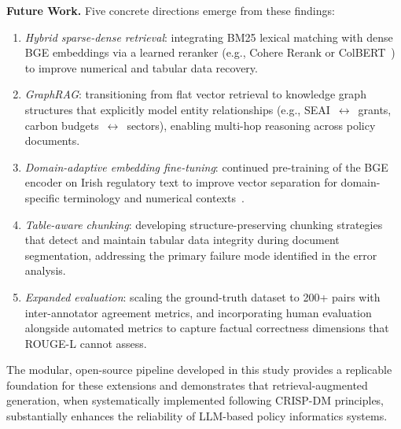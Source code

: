 \documentclass[conference]{IEEEtran}
\begin{document}
\textbf{Future Work.} Five concrete directions emerge from these findings:
\begin{enumerate}[noitemsep]
    \item \textit{Hybrid sparse-dense retrieval}: integrating BM25 lexical matching with dense BGE embeddings via a learned reranker (e.g., Cohere Rerank or ColBERT~\cite{khattab2020colbert}) to improve numerical and tabular data recovery.
    \item \textit{GraphRAG}: transitioning from flat vector retrieval to knowledge graph structures that explicitly model entity relationships (e.g., SEAI~$\leftrightarrow$~grants, carbon budgets~$\leftrightarrow$~sectors), enabling multi-hop reasoning across policy documents.
    \item \textit{Domain-adaptive embedding fine-tuning}: continued pre-training of the BGE encoder on Irish regulatory text to improve vector separation for domain-specific terminology and numerical contexts~\cite{siriwardhana2023improving}.
    \item \textit{Table-aware chunking}: developing structure-preserving chunking strategies that detect and maintain tabular data integrity during document segmentation, addressing the primary failure mode identified in the error analysis.
    \item \textit{Expanded evaluation}: scaling the ground-truth dataset to 200+ pairs with inter-annotator agreement metrics, and incorporating human evaluation alongside automated metrics to capture factual correctness dimensions that ROUGE-L cannot assess.
\end{enumerate}

The modular, open-source pipeline developed in this study provides a replicable foundation for these extensions and demonstrates that retrieval-augmented generation, when systematically implemented following CRISP-DM principles, substantially enhances the reliability of LLM-based policy informatics systems.
\end{document}
